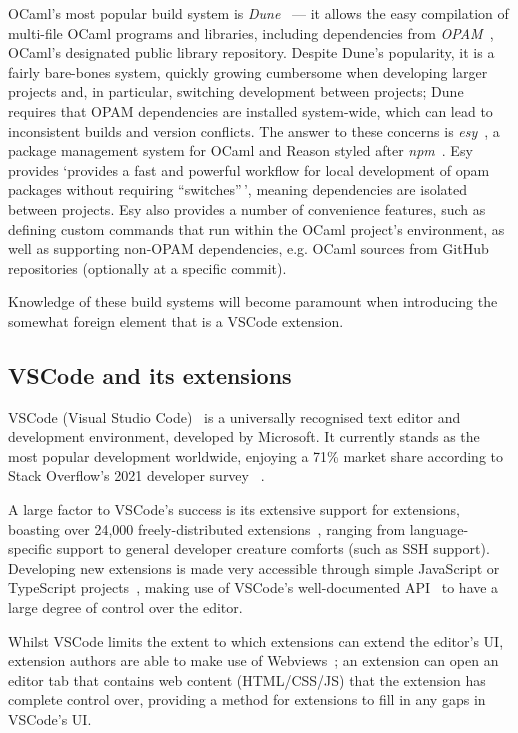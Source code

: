 OCaml's most popular build system is \textit{Dune}~\cite{dune} --- it allows the
easy compilation of multi-file OCaml programs and libraries, including
dependencies from \textit{OPAM}~\cite{opam}, OCaml's designated public library
repository. Despite Dune's popularity, it is a fairly bare-bones system, quickly
growing cumbersome when developing larger projects and, in particular,
switching development between projects; Dune requires that OPAM dependencies
are installed system-wide, which can lead to inconsistent builds and version
conflicts. The answer to these concerns is \textit{esy}~\cite{esy}, a package
management system for OCaml and Reason styled after \textit{npm}~\cite{npm}.
Esy provides `provides a fast and powerful workflow for local development of
opam packages without requiring ``switches''\,', meaning dependencies are isolated
between projects. Esy also provides a number of convenience features, such as
defining custom commands that run within the OCaml project's environment, as
well as supporting non-OPAM dependencies, e.g. OCaml sources from GitHub
repositories (optionally at a specific commit).

Knowledge of these build systems will become paramount when introducing the
somewhat foreign element that is a VSCode extension.

\subsection{VSCode and its extensions}\label{sec:vscode}

VSCode (Visual Studio Code)~\cite{vscode} is a universally recognised text
editor and development environment, developed by Microsoft. It currently stands
as the most popular development worldwide, enjoying a 71\% market share
according to Stack Overflow's 2021 developer survey
~\cite{stack-overflow-survey-editors}.

A large factor to VSCode's success is its extensive support for extensions,
boasting over 24,000 freely-distributed extensions~\cite{vscode-popularity},
ranging from language-specific support to general developer creature comforts
(such as SSH support). Developing new extensions is made very accessible through
simple JavaScript or TypeScript projects~\cite{vscode-extensions-intro}, making
use of VSCode's well-documented API~\cite{vscode-api} to have a large degree of
control over the editor.

Whilst VSCode limits the extent to which extensions can extend the editor's UI,
extension authors are able to make use of Webviews~\cite{vscode-webview}; an
extension can open an editor tab that contains web content (HTML/CSS/JS) that
the extension has complete control over, providing a method for extensions to
fill in any gaps in VSCode's UI.\@

